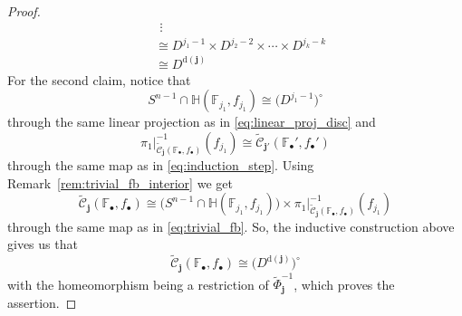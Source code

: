 \begin{proof}
\begin{align*}
&\ \,\vdots\\
&\cong D^{j_1-1}\times D^{j_2-2}\times\cdots\times D^{j_k-k}\\
&\cong D^{\mathrm{d}(\mathbf{j})}
\end{align*}
For the second claim, notice that
\[S^{n-1}\cap\mathbb{H}(\mathbb{F}_{j_1},f_{j_1})\cong\big(D^{j_1-1}\big)^{\circ}\]
through the same linear projection as in \eqref{eq:linear_proj_disc} and
\[\pi_1|_{\tilde{\mathcal{C}}_{\mathbf{j}}(\mathbb{F}_{\bullet},f_{\bullet})}^{-1}(f_{j_1})\cong\tilde{\mathcal{C}}_{\mathbf{j}'}(\mathbb{F}_{\bullet}',f_{\bullet}')\]
through the same map as in \eqref{eq:induction_step}. Using Remark~\ref{rem:trivial_fb_interior} we get
\[\tilde{\mathcal{C}}_{\mathbf{j}}(\mathbb{F}_{\bullet},f_{\bullet})\cong\big(S^{n-1}\cap\mathbb{H}(\mathbb{F}_{j_1},f_{j_1})\big)\times\pi_1|_{\tilde{\mathcal{C}}_{\mathbf{j}}(\mathbb{F}_{\bullet},f_{\bullet})}^{-1}(f_{j_1})\]
through the same map as in \eqref{eq:trivial_fb}.
So, the inductive construction above gives us that
\[\tilde{\mathcal{C}}_{\mathbf{j}}(\mathbb{F}_{\bullet},f_{\bullet})\cong\big(D^{\mathrm{d}(\mathbf{j})}\big)^{\circ}\]
with the homeomorphism being a restriction of $\tilde{\Phi}_{\mathbf{j}}^{-1}$, which proves the assertion.
\end{proof}

